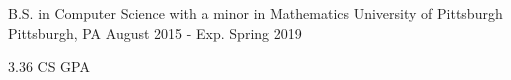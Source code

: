 
\vspace{-7mm}


\vspace{0mm}
\begin{cventries}

  \cventry
    {B.S. in Computer Science with a minor in Mathematics} %
    {University of Pittsburgh} %
    {Pittsburgh, PA} %
    {August 2015 - Exp. Spring 2019} %
    {
      \begin{cvitems} %
        \item {3.36 CS GPA}
      \end{cvitems}
    }
    
  \vspace{-6mm}
  
\end{cventries}